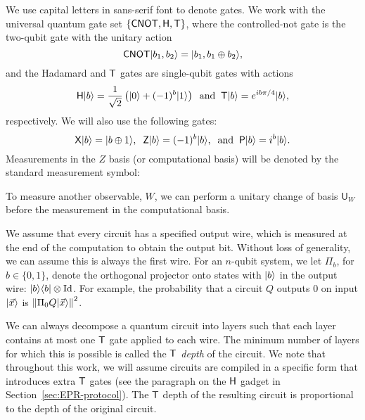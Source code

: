 We use capital letters in sans-serif font to denote gates. We work with the universal quantum gate set $\{{\sf CNOT}, {\sf H}, {\sf T}\}$, where the controlled-not gate is the two-qubit gate with the unitary action 
$${\sf CNOT}|b_1,b_2\rangle=|b_1,b_1\oplus b_2\rangle,$$ 
and the Hadamard and $\sf T$ gates are single-qubit gates with actions 
$${\sf H}|b\rangle=\frac{1}{\sqrt{2}}\left(|0\rangle+(-1)^b|1\rangle\right)\;\;\mbox{and}\;\;{\sf T}|b\rangle=e^{ib\pi/4}|b\rangle,$$ respectively. We will also use the following gates:
$${\sf X}|b\rangle=|b\oplus 1\rangle,\;\; {\sf Z}|b\rangle=(-1)^b|b\rangle,\;\;\mbox{and}\;\;{\sf P}|b\rangle=i^b|b\rangle.$$
Measurements in the $Z$ basis (or computational basis) will be denoted by the standard measurement symbol:
\begin{center}
\end{center}
To measure another observable, $W$, we can perform a unitary change of basis
$\mathsf{U}_{W}$ before the measurement in the computational basis.

We assume that every circuit has a specified output wire, which is measured at the end of the computation to obtain the output bit. Without loss of generality, we can assume this is always the first wire. For an $n$-qubit system, we let $\Pi_b$, for $b \in \{0,1\}$, denote the orthogonal projector onto states with $|b\rangle$ in the output wire: $|b\rangle\langle b|\otimes \mathop{\rm Id}\nolimits$. For example, the probability that a circuit $Q$ outputs 0 on input $|\vec{x}\rangle$ is $\left\|\Pi_0 Q|\vec{x}\rangle\right\|^2$. 

We can always decompose a quantum circuit into layers such that each layer contains at most one $\sf T$ gate applied to each wire. The minimum number of layers for which this is possible is called the \emph{$\sf T$ depth} of the circuit. 
We note that throughout this work, we will assume circuits are compiled in a specific form that introduces extra $\sf T$ gates (see the paragraph on the $\sf H$ gadget in Section~\ref{sec:EPR-protocol}). The $\sf T$ depth of the resulting circuit is proportional to the depth of the original circuit. 



